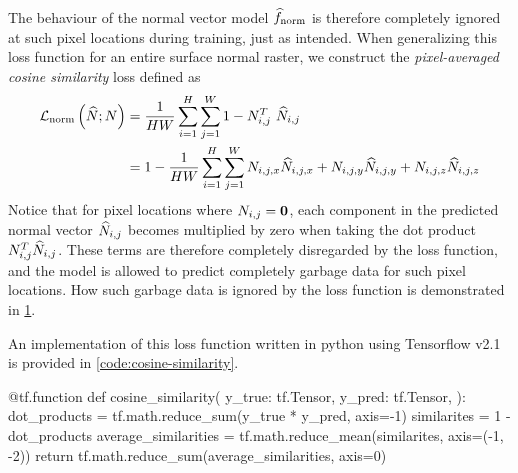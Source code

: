 The behaviour of the normal vector model $\widehat{f}_{\mathrm{norm}}$ is therefore completely ignored at such pixel locations during training, just as intended.
When generalizing this loss function for an entire surface normal raster, we construct the \textit{pixel-averaged cosine similarity} loss defined as
%
\begin{gather}\begin{aligned}
  \mathcal{L}_{\mathrm{norm}}\left(
    \widehat{N}; N
  \right)
  &=
  \frac{1}{HW}
  \sum_{i = 1}^{H}
  \sum_{j = 1}^{W}
  1 - N_{i,j}^T~\widehat{N}_{i,j}
  \\
  &=
  1 -
  \frac{1}{HW}
  \sum_{i = 1}^{H}
  \sum_{j = 1}^{W}
    N_{i,j,x} \widehat{N}_{i,j,x}
  + N_{i,j,y} \widehat{N}_{i,j,y}
  + N_{i,j,z} \widehat{N}_{i,j,z}
  \label{eq:cosine-loss}
\end{aligned}\end{gather}
%
Notice that for pixel locations where $N_{i,j} = \boldsymbol{0}$, each component in the predicted normal vector $\widehat{N}_{i,j}$ becomes multiplied by zero when taking the dot product $N_{i,j}^T \widehat{N}_{i,j}$.
These terms are therefore completely disregarded by the loss function, and the model is allowed to predict completely garbage data for such pixel locations.
How such garbage data is ignored by the loss function is demonstrated in \cref{fig:cosine-similarity-example}.
%
\begin{figure}[H]
  \centering
  \label{fig:cosine-similarity-example}
\end{figure}
\noindent
An implementation of this loss function written in python using Tensorflow v2.1 is provided in \cref{code:cosine-similarity}.
%
\begin{listing}[H]
  \caption{%
    Cosine similarity loss function implemented in Tensorflow v2.1.
  }%
  \label{code:cosine-similarity}
  \begin{pythoncode}
  @tf.function
  def cosine_similarity(
      y_true: tf.Tensor,
      y_pred: tf.Tensor,
  ):
      dot_products = tf.math.reduce_sum(y_true * y_pred, axis=-1)
      similarites = 1 - dot_products
      average_similarities = tf.math.reduce_mean(similarites, axis=(-1, -2))
      return tf.math.reduce_sum(average_similarities, axis=0)
  \end{pythoncode}
\end{listing}

